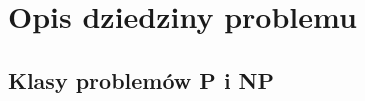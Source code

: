 \section{Opis dziedziny problemu}\label{Section_Domain}
\subsection{Klasy problemów P i NP}\label{subsection_p_np}
